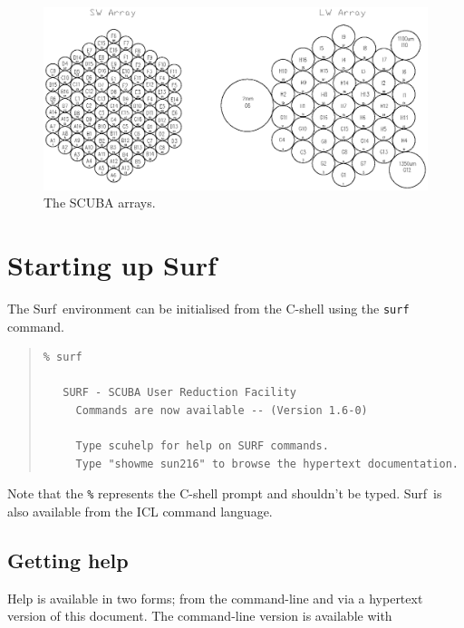 \documentclass[twoside,11pt]{article}
\newcommand{\scusoft}          {{\sc Surf}}
\newenvironment{myquote}{\begin{quote}\begin{small}}{\end{small}\end{quote}}
\newcommand{\htmlimage}[1]{}
\newcommand{\xlabel}[1]{}
\renewcommand{\_}{\texttt{\symbol{95}}}
\begin{document}
\begin{htmlonly}
\begin{figure}
\includegraphics[scale=0.65]{sun216_arrays.eps}
\caption{The SCUBA arrays.}
\label{arrays}
\end{figure}

\end{htmlonly}

\section{\xlabel{startup}Starting up \scusoft \label{startup}}

The \scusoft\ environment can be initialised from the C-shell using the
\texttt{surf} command.

\begin{myquote}
\begin{verbatim}
% surf
 
   SURF - SCUBA User Reduction Facility
     Commands are now available -- (Version 1.6-0)
 
     Type scuhelp for help on SURF commands.
     Type "showme sun216" to browse the hypertext documentation.

\end{verbatim}
\end{myquote}

Note that the \texttt{\%} represents the C-shell prompt and shouldn't be typed.
\scusoft\ is also available from the ICL command language.


\subsection{Getting help}

Help is available in two forms; from the command-line and via a hypertext 
version of this document. The command-line version is available with
\end{document}
